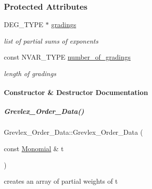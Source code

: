 \subsubsection*{Protected Attributes}
\begin{DoxyCompactItemize}
\item 
\mbox{\label{group__orderinggroup_a0a4ccd9abf8d598bdb64b015f127bf4e}} 
D\+E\+G\+\_\+\+T\+Y\+PE $\ast$ \hyperlink{group__orderinggroup_a0a4ccd9abf8d598bdb64b015f127bf4e}{gradings}
\begin{DoxyCompactList}\small\item\em list of partial sums of exponents \end{DoxyCompactList}\item 
\mbox{\label{group__orderinggroup_afaddc36a549cd365d5f10bd817ddbef5}} 
const N\+V\+A\+R\+\_\+\+T\+Y\+PE \hyperlink{group__orderinggroup_afaddc36a549cd365d5f10bd817ddbef5}{number\+\_\+of\+\_\+gradings}
\begin{DoxyCompactList}\small\item\em length of {\ttfamily gradings} \end{DoxyCompactList}\end{DoxyCompactItemize}


\paragraph{Constructor \& Destructor Documentation}
\mbox{\label{group__orderinggroup_a61000659db1597c1fb7f149deb0d952c}} 
\subparagraph{\texorpdfstring{Grevlex\+\_\+\+Order\+\_\+\+Data()}{Grevlex\_Order\_Data()}}
{\footnotesize\ttfamily Grevlex\+\_\+\+Order\+\_\+\+Data\+::\+Grevlex\+\_\+\+Order\+\_\+\+Data (\begin{DoxyParamCaption}\item[{const \hyperlink{group__polygroup_class_monomial}{Monomial} \&}]{t }\end{DoxyParamCaption})}



creates an array of partial weights of {\ttfamily t} 


